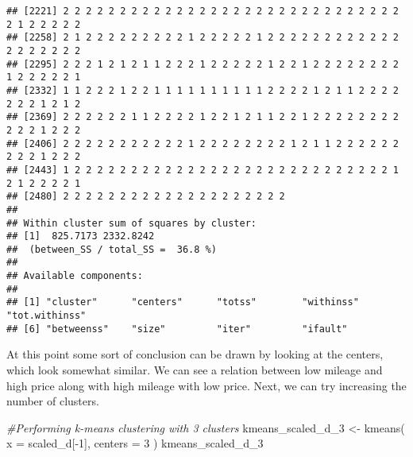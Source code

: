 \documentclass[
]{article}
\newenvironment{Shaded}{\begin{snugshade}}{\end{snugshade}}
\newcommand{\AttributeTok}[1]{\textcolor[rgb]{0.77,0.63,0.00}{#1}}
\newcommand{\CommentTok}[1]{\textcolor[rgb]{0.56,0.35,0.01}{\textit{#1}}}
\newcommand{\DecValTok}[1]{\textcolor[rgb]{0.00,0.00,0.81}{#1}}
\newcommand{\FunctionTok}[1]{\textcolor[rgb]{0.00,0.00,0.00}{#1}}
\newcommand{\NormalTok}[1]{#1}
\newcommand{\OtherTok}[1]{\textcolor[rgb]{0.56,0.35,0.01}{#1}}
\newcommand{\SpecialCharTok}[1]{\textcolor[rgb]{0.00,0.00,0.00}{#1}}
\begin{document}
\begin{verbatim}
## [2221] 2 2 2 2 2 2 2 2 2 2 2 2 2 2 2 2 2 2 2 2 2 2 2 2 2 2 2 2 2 2 2 1 2 2 2 2 2
## [2258] 2 1 2 2 2 2 2 2 2 2 2 1 2 2 2 2 2 1 2 2 2 2 2 2 2 2 2 2 2 2 2 2 2 2 2 2 2
## [2295] 2 2 2 1 2 1 2 1 1 2 2 2 1 2 2 2 2 2 1 2 2 1 2 2 2 2 2 2 2 2 1 2 2 2 2 2 1
## [2332] 1 1 2 2 2 1 2 2 1 1 1 1 1 1 1 1 1 1 2 2 2 2 1 2 1 1 2 2 2 2 2 2 2 1 2 1 2
## [2369] 2 2 2 2 2 2 1 1 2 2 2 2 1 2 2 1 2 1 1 2 2 1 2 2 2 2 2 2 2 2 2 2 2 1 2 2 2
## [2406] 2 2 2 2 2 2 2 2 2 2 2 1 2 2 2 2 2 2 2 2 1 2 1 1 2 2 2 2 2 2 2 2 2 1 2 2 2
## [2443] 1 2 2 2 2 2 2 2 2 2 2 2 2 2 2 2 2 2 2 2 2 2 2 2 2 2 2 2 2 1 2 1 2 2 2 2 1
## [2480] 2 2 2 2 2 2 2 2 2 2 2 2 2 2 2 2 2 2 2 2
## 
## Within cluster sum of squares by cluster:
## [1]  825.7173 2332.8242
##  (between_SS / total_SS =  36.8 %)
## 
## Available components:
## 
## [1] "cluster"      "centers"      "totss"        "withinss"     "tot.withinss"
## [6] "betweenss"    "size"         "iter"         "ifault"
\end{verbatim}

At this point some sort of conclusion can be drawn by looking at the
centers, which look somewhat similar. We can see a relation between low
mileage and high price along with high mileage with low price. Next, we
can try increasing the number of clusters.

\begin{Shaded}
\begin{Highlighting}[]
\CommentTok{\#Performing k{-}means clustering with 3 clusters}
\NormalTok{kmeans\_scaled\_d\_3 }\OtherTok{\textless{}{-}} \FunctionTok{kmeans}\NormalTok{(}
  \AttributeTok{x =}\NormalTok{ scaled\_d[}\SpecialCharTok{{-}}\DecValTok{1}\NormalTok{],}
  \AttributeTok{centers =} \DecValTok{3}
\NormalTok{)}
\NormalTok{kmeans\_scaled\_d\_3}
\end{Highlighting}
\end{Shaded}
\end{document}
